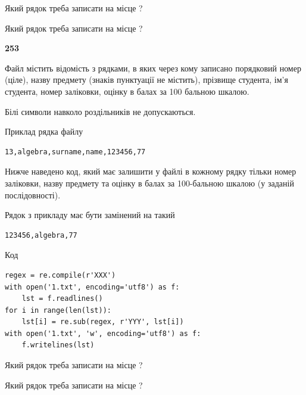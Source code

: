 Який рядок треба записати на місце  ?\par
\vspace{5mm}


Який рядок треба записати на місце  ?\par


\newpage

{\begin {center}\textbf{ 253}\end {center}}\par
Файл  містить відомість з рядками, в яких через кому записа\-но поряд\-ковий номер (ціле), назву предмету (знаків пунктуації не містить), прізвище студента, ім'я студента, номер заліковки, оцінку в балах за 100 бальною шкалою.

Білі символи навколо роздільників не допускаються.

Приклад рядка файлу



\begin{verbatim}
13,algebra,surname,name,123456,77
\end{verbatim}


Нижче наведено код, який має залишити у файлі в кожному рядку тільки номер заліковки, назву предмету та оцінку в балах за 100-бальною шкалою (у заданій послі\-дов\-ності).

Рядок з прикладу має бути замінений на такий



\begin{verbatim}
123456,algebra,77
\end{verbatim}




Код



\begin{verbatim}
regex = re.compile(r'XXX')
with open('1.txt', encoding='utf8') as f:
    lst = f.readlines()
for i in range(len(lst)):
    lst[i] = re.sub(regex, r'YYY', lst[i])
with open('1.txt', 'w', encoding='utf8') as f:
    f.writelines(lst)
\end{verbatim}







Який рядок треба записати на місце  ?\par
\vspace{5mm}


Який рядок треба записати на місце  ?\par


